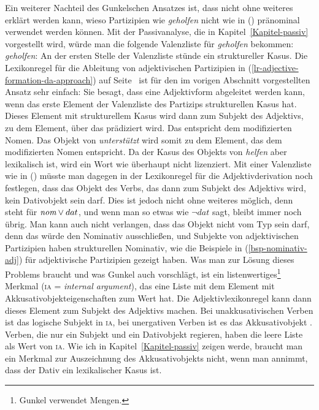 Ein weiterer Nachteil des Gunkelschen Ansatzes ist, dass nicht ohne weiteres erklärt werden kann,
wieso Partizipien wie \emph{geholfen} nicht wie in () pränominal verwendet werden können.
\z
Mit der Passivanalyse, die in Kapitel~\ref{Kapitel-passiv} vorgestellt wird, würde man die
folgende Valenzliste für \emph{geholfen} bekommen:
\ea
\emph{geholfen}: 
\z
An der ersten Stelle der Valenzliste stünde ein struktureller Kasus. Die Lexikonregel für die
Ableitung von adjektivischen Partizipien in (\ref{lr-adjective-formation-da-approach}) 
auf Seite~\pageref{lr-adjective-formation-da-approach} ist für den im vorigen Abschnitt vorgestellten
Ansatz sehr einfach: Sie besagt, dass eine Adjektivform abgeleitet werden kann, wenn das
erste Element der Valenzliste des Partizips strukturellen Kasus hat. Dieses Element mit strukturellem
Kasus wird dann zum Subjekt des Adjektivs, \dash zu dem Element, über das prädiziert wird.
Das entspricht dem modifizierten Nomen. Das Objekt von \emph{unterstützt} wird somit zu dem
Element, das dem modifizierten Nomen entspricht. Da der Kasus des Objekts von \emph{helfen}
aber lexikalisch ist, wird ein Wort wie  überhaupt nicht lizenziert. Mit einer
Valenzliste wie in () müsste man dagegen in der Lexikonregel für die Adjektivderivation
noch festlegen, dass das Objekt des Verbs, das dann zum Subjekt des Adjektivs wird,
kein Dativobjekt sein darf. Dies ist jedoch nicht ohne weiteres möglich, denn 
steht für ${\normalfont\textit{nom}} \vee dat$, und wenn man so etwas wie $\neg dat$ sagt, bleibt immer noch 
übrig. Man kann auch nicht verlangen, dass das Objekt nicht vom Typ  sein darf, denn
das würde den Nominativ ausschließen, und Subjekte von adjektivischen Partizipien haben strukturellen Nominativ,
wie die Beispiele in (\ref{bsp-nominativ-adj}) für adjektivische Partizipien gezeigt haben.
Was man zur Lösung dieses Problems braucht und was Gunkel auch vorschlägt, ist ein listenwertiges\footnote{
  Gunkel verwendet Mengen.%
}
Merkmal (\textsc{ia} = \emph{internal argument}), das eine Liste mit dem Element mit Akkusativobjekteigenschaften zum Wert hat. Die
Adjektivlexikonregel kann dann dieses Element zum Subjekt des Adjektivs machen. Bei unakkusativischen
Verben ist das logische Subjekt in \textsc{ia}, bei unergativen Verben ist es das Akkusativobjekt \citep[]{Gunkel2003b}.
Verben, die nur ein Subjekt und ein Dativobjekt regieren, haben die leere Liste als Wert von \textsc{ia}.
Wie ich in Kapitel~\ref{Kapitel-passiv} zeigen werde, braucht man ein Merkmal zur Auszeichnung des
Akkusativobjekts nicht, wenn man annimmt, dass der Dativ ein lexikalischer Kasus ist.


